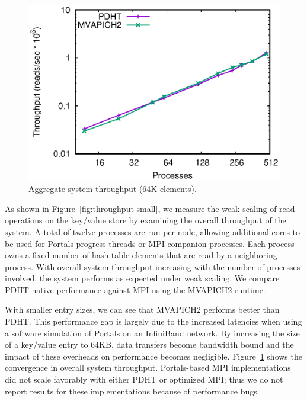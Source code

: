 \begin{figure}
    \centering
    \includegraphics[width=.9\linewidth]{plots/scaling64}
    \caption{Aggregate system throughput (64K elements).}
    \label{fig:throughput-big}
\end{figure}

As shown in Figure~\ref{fig:throughput-small}, we measure the weak scaling of
\pdht read operations on the key/value store by examining the overall
throughput of the system. A total of twelve processes are run per node,
allowing additional cores to be used for Portals progress threads or MPI
companion processes.  Each process owns a fixed number of hash table elements
that are read by a neighboring process. With overall system throughput
increasing with the number of processes involved, the system performs as
expected under weak scaling. We compare PDHT native performance against MPI
using the MVAPICH2 runtime.

With smaller entry sizes, we can see that MVAPICH2 performs better than PDHT.
This performance gap is largely due to the increased latencies when using a
software simulation of Portals on an InfiniBand network. By increasing the size
of a key/value entry to 64KB, data transfers become bandwidth bound and the
impact of these overheads on performance becomes negligible.
Figure~\ref{fig:throughput-big} shows the convergence in overall system
throughput. Portals-based MPI implementations did not scale favorably with
either PDHT or optimized MPI; thus we do not report results for these
implementations because of performance bugs.



